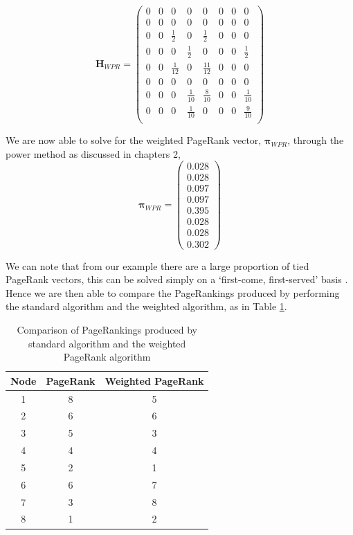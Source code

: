 \documentclass[11pt]{report}
\begin{document}
\[\textbf{H}_{WPR}=\left(
\begin{array}{cccccccc}
0 & 0 & 0 & 0 & 0 & 0 & 0 & 0 \\
0 & 0 & 0 & 0 & 0 & 0 & 0 & 0\\
0 & 0 & \frac{1}{2} & 0 & \frac{1}{2} & 0 & 0 & 0\\
0 & 0 & 0 & \frac{1}{2} & 0 & 0 & 0 & \frac{1}{2}\\
0 & 0 & \frac{1}{12} & 0 & \frac{11}{12} & 0 & 0 & 0\\
0 & 0 & 0 & 0 & 0 & 0 & 0 & 0 \\
0 & 0 & 0 & \frac{1}{10} & \frac{8}{10} & 0 & 0 & \frac{1}{10}\\
0 & 0 & 0 & \frac{1}{10} & 0 & 0 & 0 & \frac{9}{10}\\
\end{array}
\right)	\]

We are now able to solve for the weighted PageRank vector, $\boldsymbol\pi_{WPR}$, through the power method as discussed in chapters 2,
\[\boldsymbol\pi_{WPR} = \left(
\begin{array}{c}
0.028 \\
0.028 \\
0.097 \\
0.097 \\
0.395 \\
0.028 \\
0.028 \\
0.302
\end{array}
\right)\]

We can note that from our example there are a large proportion of tied PageRank vectors, this can be solved simply on a `first-come, first-served' basis \cite{langville}. Hence we are then able to compare the PageRankings produced by performing the standard algorithm and the weighted algorithm, as in Table \ref{tble:Weighted PageRank and PR}. 

\begin{table}[h] \caption{Comparison of PageRankings produced by standard algorithm and the weighted PageRank algorithm}
 \centering
 \begin{tabular} {c|c c} 
 Node & PageRank & Weighted PageRank \\ [0.5ex] 
 \hline
 1&8&5\\
 2&6&6\\
 3&5&3\\
 4&4&4\\
 5&2&1\\
 6&6&7\\
 7&3&8\\
 8&1&2\\
 \end{tabular}
 \label{tble:Weighted PageRank and PR}
\end{table}
\end{document}
